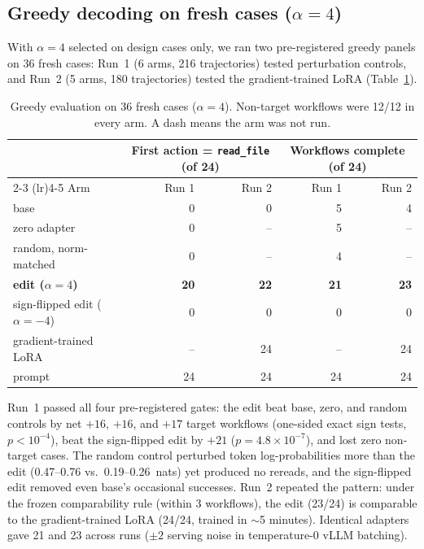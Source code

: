 \documentclass[11pt]{article}
\begin{document}
\subsection{Greedy decoding on fresh cases (\texorpdfstring{$\alpha=4$}{alpha = 4})}
With $\alpha=4$ selected on design cases only, we ran two pre-registered greedy panels on 36 fresh cases: Run~1 (6 arms, 216 trajectories) tested perturbation controls, and Run~2 (5 arms, 180 trajectories) tested the gradient-trained LoRA (Table~\ref{tab:greedy}).

\begin{table}[ht]
\centering
\caption{Greedy evaluation on 36 fresh cases ($\alpha=4$). Non-target workflows were 12/12 in every arm. A dash means the arm was not run.}
\label{tab:greedy}
\vspace{2pt}
\begin{tabular}{lrrrr}
\toprule
 & \multicolumn{2}{c}{First action = \texttt{read\_file} (of 24)} & \multicolumn{2}{c}{Workflows complete (of 24)} \\
\cmidrule(lr){2-3} \cmidrule(lr){4-5}
Arm & Run 1 & Run 2 & Run 1 & Run 2 \\ \midrule
base & 0 & 0 & 5 & 4 \\
zero adapter & 0 & -- & 5 & -- \\
random, norm-matched & 0 & -- & 4 & -- \\
\textbf{edit ($\alpha=4$)} & \textbf{20} & \textbf{22} & \textbf{21} & \textbf{23} \\
sign-flipped edit ($\alpha=-4$) & 0 & 0 & 0 & 0 \\
gradient-trained LoRA & -- & 24 & -- & 24 \\
prompt & 24 & 24 & 24 & 24 \\ \bottomrule
\end{tabular}
\end{table}

Run~1 passed all four pre-registered gates: the edit beat base, zero, and random controls by net $+16$, $+16$, and $+17$ target workflows (one-sided exact sign tests, $p<10^{-4}$), beat the sign-flipped edit by $+21$ ($p=4.8\times 10^{-7}$), and lost zero non-target cases. The random control perturbed token log-probabilities more than the edit (0.47--0.76 vs.\ 0.19--0.26~nats) yet produced no rereads, and the sign-flipped edit removed even base's occasional successes. Run~2 repeated the pattern: under the frozen comparability rule (within 3 workflows), the edit (23/24) is comparable to the gradient-trained LoRA (24/24, trained in $\sim$5 minutes). Identical adapters gave 21 and 23 across runs ($\pm 2$ serving noise in temperature-0 vLLM batching).
\end{document}
